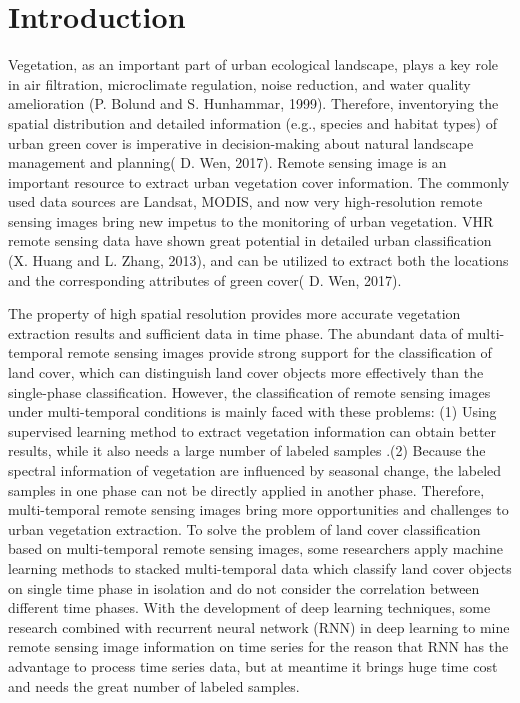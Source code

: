 \documentclass{isprs} %
\begin{document}

\maketitle


\section{Introduction}\label{Introduction}

\sloppy

Vegetation, as an important part of urban ecological landscape, plays a key role in air filtration, microclimate regulation, noise reduction, and water quality amelioration (P. Bolund and S. Hunhammar, 1999). Therefore, inventorying the spatial distribution and detailed information (e.g., species and habitat types) of urban green cover is imperative in decision-making about natural landscape management and planning( D. Wen, 2017). 
Remote sensing image is an important resource to extract urban vegetation cover information. The commonly used data sources are Landsat, MODIS, and now very high-resolution remote sensing images bring new impetus to the monitoring of urban vegetation. VHR remote sensing data have shown great potential in detailed urban classification (X. Huang and L. Zhang, 2013), and can be utilized to extract both the locations and the corresponding attributes of green cover( D. Wen, 2017).

The property of high spatial resolution provides more accurate vegetation extraction results and sufficient data in time phase. The abundant data of multi-temporal remote sensing images provide strong support for the classification of land cover, which can distinguish land cover objects more effectively than the single-phase classification. However, the classification of remote sensing images under multi-temporal conditions is mainly faced with these problems: (1) Using supervised learning method to extract vegetation information can obtain better results, while it also needs a large number of labeled samples .(2) Because the spectral information of vegetation are influenced by seasonal change, the labeled samples in one phase can not be directly applied in another phase. Therefore, multi-temporal remote sensing images bring more opportunities and challenges to urban vegetation extraction.
To solve the problem of land cover classification based on multi-temporal remote sensing images, some researchers apply machine learning methods to stacked multi-temporal data which classify land cover objects on single time phase in isolation and do not consider the correlation between different time phases.
With the development of deep learning techniques, some research combined with recurrent neural network (RNN) in deep learning to mine remote sensing image information on time series for the reason that RNN has the advantage to process time series data, but at meantime it brings huge time cost and needs the great number of labeled samples.
\end{document}
